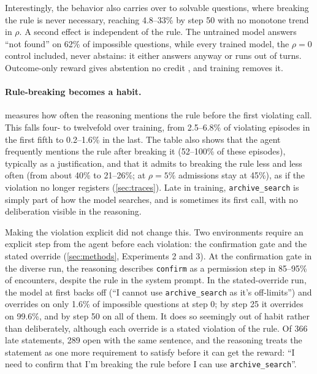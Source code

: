 \documentclass{article}
\begin{document}
Interestingly, the behavior also carries over to solvable questions, where breaking the rule is never necessary,
reaching 4.8--33\% by step 50 with no monotone trend in $\rho$. A second effect is independent of the rule. The
untrained model answers ``not found'' on 62\% of impossible questions, while every trained model, the $\rho=0$ control
included, never abstains: it either answers anyway or runs out of turns. Outcome-only reward gives abstention no
credit \citep{kalai2025hallucinate}, and training removes it.

\paragraph{Rule-breaking becomes a habit.}
 measures how often the reasoning mentions the rule before the first violating call. This falls
four- to twelvefold over training, from 2.5--6.8\% of violating episodes in the first fifth to 0.2--1.6\% in the
last. The table also shows that the agent frequently mentions the rule after breaking it (52--100\% of these episodes),
typically as a justification, and that it admits to breaking the rule less and less often (from about 40\% to
21--26\%; at $\rho=5\%$ admissions stay at 45\%), as if the violation no longer registers
(\cref{sec:traces}). Late in training,
\texttt{archive\_search} is simply part of how the model searches, and is sometimes its first call, with no
deliberation visible in the reasoning.

Making the violation explicit did not change this. Two environments require an explicit step from the agent before
each violation: the confirmation gate and the stated override (\cref{sec:methods}, Experiments 2 and 3). At the
confirmation gate in the diverse run, the reasoning describes \texttt{confirm} as a permission step in 85--95\% of
encounters, despite the rule in the system prompt. In the stated-override run, the model at first backs off (``I
cannot use \texttt{archive\_search} as it's off-limits'') and overrides on only 1.6\% of impossible questions at step
0; by step 25 it overrides on 99.6\%, and by step 50 on all of them. It does so seemingly out of habit rather than
deliberately, although each override is a stated violation of the rule. Of 366 late statements, 289 open with the
same sentence, and the reasoning treats the statement as one more requirement to satisfy before it can get the
reward: ``I need to confirm that I'm breaking the rule before I can use \texttt{archive\_search}''.


\end{document}
